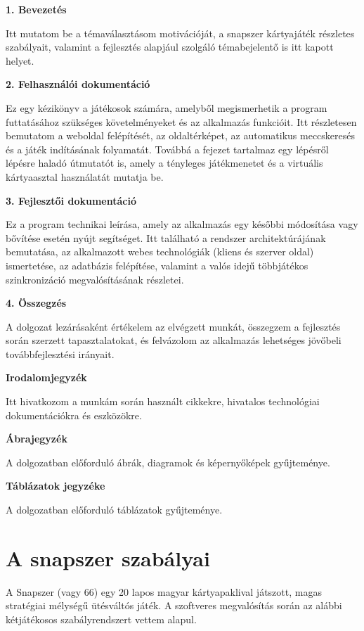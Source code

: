 \vspace{1em}
\noindent\textbf{1. Bevezetés}

Itt mutatom be a témaválasztásom motivációját, a snapszer kártyajáték részletes szabályait, valamint a fejlesztés alapjául szolgáló témabejelentő is itt kapott helyet.

\vspace{1em}
\noindent\textbf{2. Felhasználói dokumentáció}

Ez egy kézikönyv a játékosok számára, amelyből megismerhetik a program futtatásához szükséges követelményeket és az alkalmazás funkcióit. Itt részletesen bemutatom a weboldal felépítését, az oldaltérképet, az automatikus meccskeresés és a játék indításának folyamatát. Továbbá a fejezet tartalmaz egy lépésről lépésre haladó útmutatót is, amely a tényleges játékmenetet és a virtuális kártyaasztal használatát mutatja be.

\vspace{1em}
\noindent\textbf{3. Fejlesztői dokumentáció}

Ez a program technikai leírása, amely az alkalmazás egy későbbi módosítása vagy bővítése esetén nyújt segítséget. Itt található a rendszer architektúrájának bemutatása, az alkalmazott webes technológiák (kliens és szerver oldal) ismertetése, az adatbázis felépítése, valamint a valós idejű többjátékos szinkronizáció megvalósításának részletei.

\vspace{1em}
\noindent\textbf{4. Összegzés}

A dolgozat lezárásaként értékelem az elvégzett munkát, összegzem a fejlesztés során szerzett tapasztalatokat, és felvázolom az alkalmazás lehetséges jövőbeli továbbfejlesztési irányait.

\vspace{1em}
\noindent\textbf{Irodalomjegyzék}

Itt hivatkozom a munkám során használt cikkekre, hivatalos technológiai dokumentációkra és eszközökre.

\vspace{1em}
\noindent\textbf{Ábrajegyzék}

A dolgozatban előforduló ábrák, diagramok és képernyőképek gyűjteménye.

\vspace{1em}
\noindent\textbf{Táblázatok jegyzéke}

A dolgozatban előforduló táblázatok gyűjteménye.

\section{A snapszer szabályai}
\label{sec:szabalyok}
A Snapszer (vagy 66) egy 20 lapos magyar kártyapaklival játszott, magas stratégiai mélységű ütésváltós játék.
A szoftveres megvalósítás során az alábbi kétjátékosos szabályrendszert vettem alapul.

